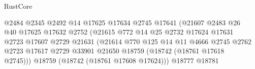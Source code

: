 \begin{lexlean}{RustCore}
\begin{coremodule}
                                                @2484
                                                @2345
                                                @2492
                                                @14
                                                @17625
                                                @17634
                                                @2745
                                                @17641
                                                (@21607
                                                  @2483
                                                  @26
                                                  @40
                                                  @17625
                                                  @17632
                                                  @2752
                                                  (@21615
                                                    @772
                                                    @14
                                                    @25
                                                    @2732
                                                    @17624
                                                    @17631
                                                    @2723
                                                    @17607
                                                    @2729
                                                    @21631
                                                    (@21614
                                                      @770
                                                      @125
                                                      @14
                                                      @11
                                                      @4666
                                                      @2745
                                                      @2762
                                                      @2723
                                                      @17617
                                                      @2729
                                                      @33901
                                                      @21650
                                                      @18759
                                                      (@18742 (@18761 @17618 @2745)))
                                                    @18759
                                                    (@18742 (@18761 @17608 @17624)))
                                                  @18777
                                                  @18781

\end{coremodule}
\end{lexlean}
